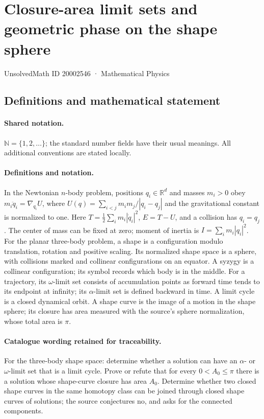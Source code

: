 \documentclass[11pt]{article}
\begin{document}
\setcounter{section}{20002545}
\section{Closure-area limit sets and geometric phase on the shape sphere}\label{20002546}
{\small UnsolvedMath ID 20002546 · Mathematical Physics}
\subsection{Definitions and mathematical statement}

\paragraph{Shared notation.}$\mathbb N=\{1,2,\ldots\}$; the standard number fields have their usual meanings. All additional conventions are stated locally.


\paragraph{Definitions and notation.}In the Newtonian $n$-body problem, positions $q_i\in\mathbb R^d$ and masses $m_i>0$ obey $m_i\ddot q_i=\nabla_{q_i}U$, where $U(q)=\sum_{i<j}m_im_j/|q_i-q_j|$ and the gravitational constant is normalized to one. Here $T=\tfrac12\sum_i m_i|\dot q_i|^2$, $E=T-U$, and a collision has $q_i=q_j$. The center of mass can be fixed at zero; moment of inertia is $I=\sum_i m_i|q_i|^2$. For the planar three-body problem, a shape is a configuration modulo translation, rotation and positive scaling. Its normalized shape space is a sphere, with collisions marked and collinear configurations on an equator. A syzygy is a collinear configuration; its symbol records which body is in the middle. For a trajectory, its $\omega$-limit set consists of accumulation points as forward time tends to its endpoint at infinity; its $\alpha$-limit set is defined backward in time. A limit cycle is a closed dynamical orbit. A shape curve is the image of a motion in the shape sphere; its closure has area measured with the source’s sphere normalization, whose total area is $\pi$.

\paragraph{Catalogue wording retained for traceability.}
For the three-body shape space: determine whether a solution can have an $\alpha$- or $\omega$-limit set that is a limit cycle. Prove or refute that for every $0<A_0\le\pi$ there is a solution whose shape-curve closure has area $A_0$. Determine whether two closed shape curves in the same homotopy class can be joined through closed shape curves of solutions; the source conjectures no, and asks for the connected components.
\end{document}
